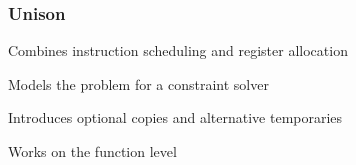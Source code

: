 \begin{frame}
	\frametitle{Unison}
	
	Combines instruction scheduling and register allocation

	\vspace{0.5cm}

	Models the problem for a constraint solver

	\vspace{0.5cm}

	Introduces optional copies and alternative temporaries

	\vspace{0.5cm}

	Works on the function level

\end{frame}
